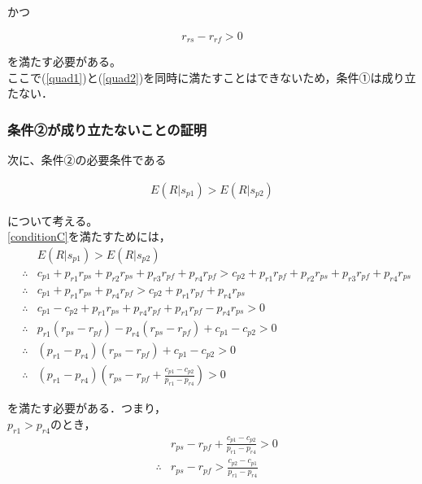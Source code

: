 かつ

\begin{equation}
   \label{quad2}
   r_{rs} - r_{rf} > 0
\end{equation}

を満たす必要がある。\\

ここで(\ref{quad1})と(\ref{quad2})を同時に満たすことはできないため，条件①は成り立たない．\\


\subsubsection{条件②が成り立たないことの証明}
次に、条件②の必要条件である

\begin{gather}
  E(R |s_{p1}) > E(R |s_{p2}) \label{conditionC}
\end{gather}

について考える。\\

\eqref{conditionC}を満たすためには，
\begin{eqnarray*}
  &&E(R |s_{p1}) > E(R |s_{p2}) \\
  &\therefore& c_{p1} + p_{r1} r_{ps} + p_{r2} r_{ps} + p_{r3} r_{pf} + p_{r4} r_{pf} > c_{p2} + p_{r1} r_{pf} + p_{r2} r_{ps} + p_{r3} r_{pf} + p_{r4} r_{ps} \\
  &\therefore& c_{p1} + p_{r1} r_{ps} + p_{r4} r_{pf} > c_{p2} + p_{r1} r_{pf} + p_{r4} r_{ps} \\
  &\therefore& c_{p1} - c_{p2} + p_{r1} r_{ps} + p_{r4} r_{pf} + p_{r1} r_{pf} - p_{r4} r_{ps} > 0 \\
  &\therefore& p_{r1}(r_{ps} - r_{pf}) - p_{r4}(r_{ps} - r_{pf}) + c_{p1} - c_{p2} > 0 \\
  &\therefore& (p_{r1} - p_{r4})(r_{ps} - r_{pf}) + c_{p1} - c_{p2} > 0 \\
  &\therefore& (p_{r1} - p_{r4})(r_{ps} - r_{pf} + \frac{ c_{p1} - c_{p2} }{p_{r1} - p_{r4}}) > 0
\end{eqnarray*}

を満たす必要がある．つまり，\\

$p_{r1} > p_{r4}$のとき， 
\begin{eqnarray}
  &&r_{ps} - r_{pf} + \frac{ c_{p1} - c_{p2} }{p_{r1} - p_{r4}} > 0\nonumber \\
  &\therefore&r_{ps} - r_{pf} > \frac{ c_{p2} - c_{p1} }{ p_{r1} - p_{r4} } \nonumber
\end{eqnarray}

